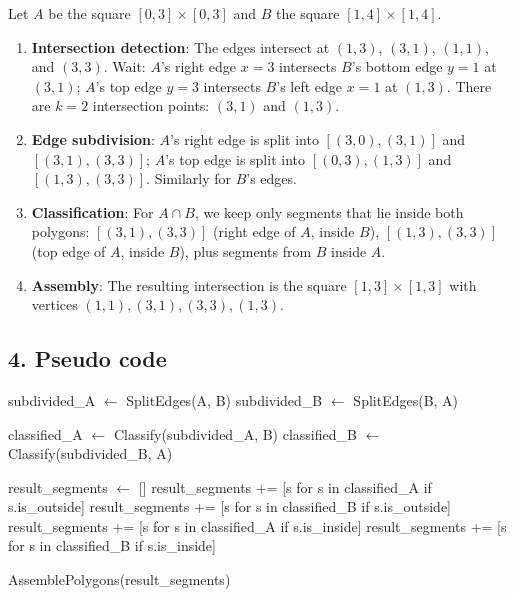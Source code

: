 \begin{example}
\label{ex:pb_trace}
Let $A$ be the square $[0,3] \times [0,3]$ and $B$ the square $[1,4] \times [1,4]$.
\begin{enumerate}
    \item \textbf{Intersection detection}: The edges intersect at $(1,3)$, $(3,1)$, $(1,1)$, and $(3,3)$.  Wait: $A$'s right edge $x=3$ intersects $B$'s bottom edge $y=1$ at $(3,1)$; $A$'s top edge $y=3$ intersects $B$'s left edge $x=1$ at $(1,3)$. There are $k=2$ intersection points: $(3,1)$ and $(1,3)$.
    \item \textbf{Edge subdivision}: $A$'s right edge is split into $[(3,0),(3,1)]$ and $[(3,1),(3,3)]$; $A$'s top edge is split into $[(0,3),(1,3)]$ and $[(1,3),(3,3)]$.  Similarly for $B$'s edges.
    \item \textbf{Classification}: For $A \cap B$, we keep only segments that lie inside both polygons: $[(3,1),(3,3)]$ (right edge of $A$, inside $B$), $[(1,3),(3,3)]$ (top edge of $A$, inside $B$), plus segments from $B$ inside $A$.
    \item \textbf{Assembly}: The resulting intersection is the square $[1,3] \times [1,3]$ with vertices $(1,1), (3,1), (3,3), (1,3)$.
\end{enumerate}
\end{example}



\subsection{4. Pseudo code}
\begin{algorithm}
\begin{algorithmic}[1]
\label{alg:polygon_boolean}
    \State subdivided\_A $\gets$ SplitEdges(A, B)
    \State subdivided\_B $\gets$ SplitEdges(B, A)
    
    \State classified\_A $\gets$ Classify(subdivided\_A, B)
    \State classified\_B $\gets$ Classify(subdivided\_B, A)
    
    \State result\_segments $\gets$ []
        \State result\_segments += [s for s in classified\_A if s.is\_outside]
        \State result\_segments += [s for s in classified\_B if s.is\_outside]
        \State result\_segments += [s for s in classified\_A if s.is\_inside]
        \State result\_segments += [s for s in classified\_B if s.is\_inside]
    \EndIf
        
    \State \Return AssemblePolygons(result\_segments)
\EndFunction
\end{algorithmic}
\end{algorithm}

